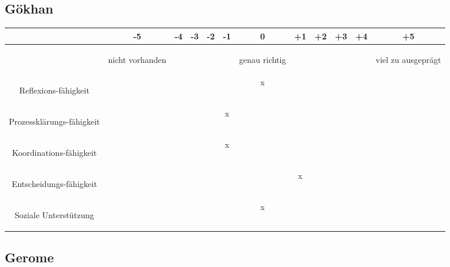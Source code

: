\subsection*{Gökhan}
\begin{tabular}{C{\fabstand}|C{\abstand}|C{\abstand}|C{\abstand}|C{\abstand}|C{\abstand}|C{\abstand}|C{\abstand}|C{\abstand}|C{\abstand}|C{\abstand}|C{\abstand}|}
\hline
& -5 & -4 & -3 & -2 & -1 & 0 & +1 & +2 & +3 & +4 & +5\\
\hline
&\begin{tiny}nicht vorhanden \end{tiny}& & & & & \begin{tiny}genau richtig \end{tiny}& & & & & \begin{tiny}viel zu ausgeprägt\end{tiny}\\
\hline
\begin{tiny} Reflexions-fähigkeit \end{tiny} & & & & & & x & & & & & \\
\hline
\begin{tiny} Prozessklärungs-fähigkeit \end{tiny}& & & & & x & & & & & & \\
\hline
\begin{tiny} Koordinations-fähigkeit \end{tiny}& & & & & x & & & & & & \\
\hline
\begin{tiny} Entscheidungs-fähigkeit \end{tiny}& & & & & & & x & & & & \\
\hline
\begin{tiny} Soziale Unterstützung \end{tiny}& & & & & & x & & & & & \\
\hline
\end{tabular}

\subsection*{Gerome}

